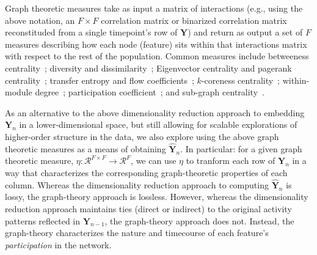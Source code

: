 \documentclass[english]{article}
\begin{document}
Graph theoretic measures take as input a matrix of interactions (e.g.,
using the above notation, an $F \times F$ correlation matrix or
binarized correlation matrix reconstituded from a single timepoint's
row of $\mathbf{Y}$) and return as output a set of $F$ measures
describing how each node (feature) sits within that interactions
matrix with respect to the rest of the population.  Common measures
include betweeness centrality~\citep[the proportion of shortest paths
between each pair of nodes in the population that involves the given
node in question; e.g., ][]{Newm05, OpsaEtal10, Bart04, GeisEtal08,
  Free77}; diversity and dissimilarity~\citep[characterizations of how
differently connected a given node is from others in the population;
e.g., ][]{Rao82, Lin09, RicoSzei06}; Eigenvector centrality and
pagerank centrality~\citep[measures of how influential a given node is
within the broader network; e.g., ][]{Newm08, Bona07, LohmEtal10,
  HaluEtal13}; transfer entropy and flow coefficients~\citep[a measure
of how much information is flowing from a given node to other nodes in
the network; e.g., ][]{HoneEtal07, Schr00}; $k$-coreness
centrality~\citep[a measure of the connectivity of a node within its
local sub-graph; e.g., ][]{AlvaEtal05, ChriFowl10}; within-module
degree~\citep[a measure of how many connections a node has to its
close neighbors in the network; e.g., ][]{RubiSpor10}; participation
coefficient~\citep[a measure of the diversity of a node's connections
to different sub-graphs in the network; e.g., ][]{RubiSpor10}; and
sub-graph centrality~\citep[a measure of a node's participation in all
of the network's sub-graphs; e.g., ][]{EstrRodr05}.

As an alternative to the above dimensionality reduction approach to
embedding $\mathbf{Y}_n$ in a lower-dimensional space, but still
allowing for scalable explorations of higher-order structure in the
data, we also explore using the above graph theoretic measures as a
means of obtaining $\hat{\mathbf{Y}}_n$.  In particular: for a given
graph theoretic measure, $\eta: \mathcal{R}^{F \times F} \rightarrow
\mathcal{R}^F$, we can use $\eta$ to tranform each row of
$\mathbf{Y}_n$ in a way that characterizes the corresponding
graph-theoretic properties of each column.  Whereas the dimensionality
reduction approach to computing $\hat{\mathbf{Y}}_n$ is lossy,
the graph-theory approach is lossless.  However, whereas the
dimensionality reduction approach maintains ties (direct or indirect)
to the original activity patterns reflected in $\mathbf{Y}_{n-1}$, the
graph-theory approach does not.  Instead, the graph-theory
characterizes the nature and timecourse of each feature's
\textit{participation} in the network.
\end{document}
